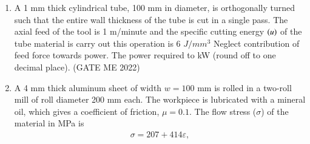 \documentclass[journal]{IEEEtran}
\numberwithin{equation}{enumi}
\numberwithin{figure}{enumi}
\begin{document}
\begin{enumerate}
\item 
A 1 mm thick cylindrical tube, 100 mm in diameter, is orthogonally turned such that the entire wall thickness of the tube is cut in a single pass. The axial feed of the tool is 1 m/minute and the specific cutting energy $\left(u\right)$ of the tube material is
carry out this operation is 6 $J/mm^3$ Neglect contribution of feed force towards power. The power required to kW (round off to one decimal place).
\hfill{(GATE ME 2022)}
 
\item A 4 mm thick aluminum sheet of width \( w = 100 \) mm is rolled in a two-roll mill of roll diameter 200 mm each. The workpiece is lubricated with a mineral oil, which gives a coefficient of friction, \( \mu = 0.1 \). The flow stress (\( \sigma \)) of the material in MPa is
    \begin{align*}
        \sigma = 207 + 414 \varepsilon,
    \end{align*}


\end{enumerate}
\end{document}
